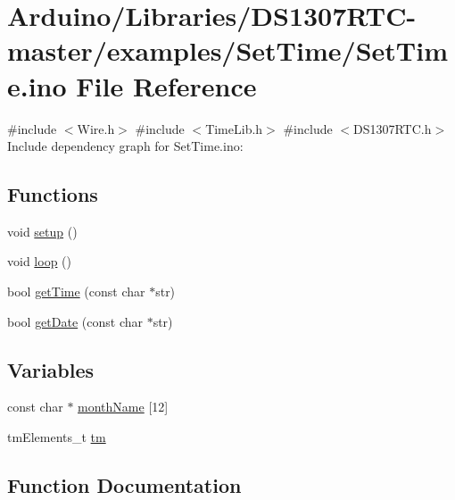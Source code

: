 \hypertarget{_set_time_8ino}{}\section{Arduino/\+Libraries/\+D\+S1307\+R\+T\+C-\/master/examples/\+Set\+Time/\+Set\+Time.ino File Reference}
\label{_set_time_8ino}
{\ttfamily \#include $<$Wire.\+h$>$}\newline
{\ttfamily \#include $<$Time\+Lib.\+h$>$}\newline
{\ttfamily \#include $<$D\+S1307\+R\+T\+C.\+h$>$}\newline
Include dependency graph for Set\+Time.\+ino\+:
\subsection*{Functions}
\begin{DoxyCompactItemize}
\item 
void \hyperlink{_set_time_8ino_a4fc01d736fe50cf5b977f755b675f11d}{setup} ()
\item 
void \hyperlink{_set_time_8ino_afe461d27b9c48d5921c00d521181f12f}{loop} ()
\item 
bool \hyperlink{_set_time_8ino_ae96ca3df2e8b9eef75d400de6ef06db3}{get\+Time} (const char $\ast$str)
\item 
bool \hyperlink{_set_time_8ino_a100af87d91fcaa6f23f2ca6a2fe146cc}{get\+Date} (const char $\ast$str)
\end{DoxyCompactItemize}
\subsection*{Variables}
\begin{DoxyCompactItemize}
\item 
const char $\ast$ \hyperlink{_set_time_8ino_a9fce7af8b9842b4ab3b85327b1af13fc}{month\+Name} \mbox{[}12\mbox{]}
\item 
tm\+Elements\+\_\+t \hyperlink{_set_time_8ino_a52357cbf68af66972047f7aed7a45218}{tm}
\end{DoxyCompactItemize}


\subsection{Function Documentation}
\mbox{\label{_set_time_8ino_a100af87d91fcaa6f23f2ca6a2fe146cc}} 
